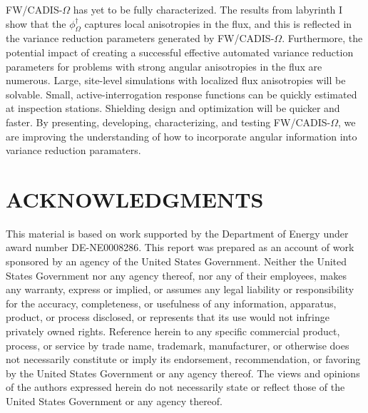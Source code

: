 \documentclass[12pt]{article}
\begin{document}

FW/CADIS-$\Omega$ has yet to be fully characterized. The results from labyrinth I show that the $\phi^{\dagger}_{\Omega}$ captures local anisotropies in the flux, and this is reflected in the variance reduction parameters generated by FW/CADIS-$\Omega$.  Furthermore, the potential impact of creating a successful effective automated variance reduction parameters for problems with strong angular anisotropies in the flux are numerous. Large, site-level simulations with localized flux anisotropies will be solvable. Small, active-interrogation response functions can be quickly estimated at inspection stations. Shielding design and optimization will be quicker and faster. By  presenting, developing, characterizing, and testing FW/CADIS-$\Omega$, we are improving the understanding of how to incorporate angular information into variance reduction paramaters. 



%
\section*{ACKNOWLEDGMENTS}

This material is based on work supported by the Department of Energy under award number DE-NE0008286. This report was prepared as an account of work sponsored by an agency of the United States Government. Neither the United States Government nor any agency thereof, nor any of their employees, makes any warranty, express or implied, or assumes any legal liability or responsibility for the accuracy, completeness, or usefulness of any information, apparatus, product, or process disclosed, or represents that its use would not infringe privately owned rights. Reference herein to any specific commercial product, process, or service by trade name, trademark, manufacturer, or otherwise does not necessarily constitute or imply its endorsement, recommendation, or favoring by the United States Government or any agency thereof. The views and opinions of the authors expressed herein do not necessarily state or reflect those of the United States Government or any agency thereof.
\end{document}
